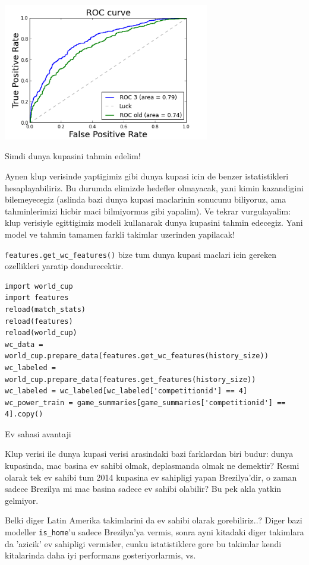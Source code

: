 \documentclass[12pt,fleqn]{article}\usepackage{../common}
\begin{document}
\includegraphics[height=6cm]{doc_en_02.png}

Simdi dunya kupasini tahmin edelim!

Aynen klup verisinde yaptigimiz gibi dunya kupasi icin de benzer
istatistikleri hesaplayabiliriz. Bu durumda elimizde hedefler olmayacak,
yani kimin kazandigini bilemeyecegiz (aslinda bazi dunya kupasi maclarinin
sonucunu biliyoruz, ama tahminlerimizi hicbir maci bilmiyormus gibi
yapalim). Ve tekrar vurgulayalim: klup verisiyle egittigimiz modeli
kullanarak dunya kupasini tahmin edecegiz. Yani model ve tahmin tamamen
farkli takimlar uzerinden yapilacak!

\verb!features.get_wc_features()! bize tum dunya kupasi maclari icin
gereken ozellikleri yaratip dondurecektir.

\begin{verbatim}
import world_cup
import features
reload(match_stats)
reload(features)
reload(world_cup)
wc_data = world_cup.prepare_data(features.get_wc_features(history_size))
wc_labeled = world_cup.prepare_data(features.get_features(history_size))
wc_labeled = wc_labeled[wc_labeled['competitionid'] == 4]
wc_power_train = game_summaries[game_summaries['competitionid'] == 4].copy()
\end{verbatim}

Ev sahasi avantaji

Klup verisi ile dunya kupasi verisi arasindaki bazi farklardan biri budur:
dunya kupasinda, mac basina ev sahibi olmak, deplasmanda olmak ne demektir?
Resmi olarak tek ev sahibi tum 2014 kupasina ev sahipligi yapan
Brezilya'dir, o zaman sadece Brezilya mi mac basina sadece ev sahibi
olabilir? Bu pek akla yatkin gelmiyor. 

Belki diger Latin Amerika takimlarini da ev sahibi olarak gorebiliriz..?
Diger bazi modeller \verb!is_home!'u sadece Brezilya'ya vermis, sonra ayni
kitadaki diger takimlara da 'azicik' ev sahipligi vermisler, cunku
istatistiklere gore bu takimlar kendi kitalarinda daha iyi performans
gosteriyorlarmis, vs.
\end{document}
